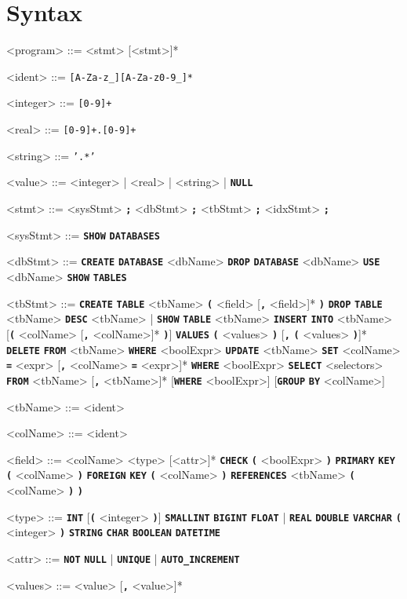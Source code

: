 \documentclass{article}
\renewcommand{\t}[1]{\texttt{\textbf{#1}}}
\begin{document}
\section{Syntax}
\setlength{\grammarindent}{10em}
\begin{grammar}

<program> ::= <stmt> [<stmt>]*

<ident> ::= \texttt{[A-Za-z_][A-Za-z0-9_]*}

<integer> ::= \texttt{[0-9]+}

<real> ::= \texttt{[0-9]+.[0-9]+}

<string> ::= \texttt{'.*'}

<value> ::= <integer> | <real> | <string> | \t{NULL}

<stmt> ::= <sysStmt> \t{;}
\alt <dbStmt> \t{;}
\alt <tbStmt> \t{;}
\alt <idxStmt> \t{;}

<sysStmt> ::= \t{SHOW} \t{DATABASES}

<dbStmt> ::= \t{CREATE} \t{DATABASE} <dbName>
\alt \t{DROP} \t{DATABASE} <dbName>
\alt \t{USE} <dbName>
\alt \t{SHOW} \t{TABLES}

<tbStmt> ::= \t{CREATE} \t{TABLE} <tbName> \t{(} <field> [\t{,} <field>]* \t{)}
\alt \t{DROP} \t{TABLE} <tbName>
\alt \t{DESC} <tbName> | \t{SHOW} \t{TABLE} <tbName>
\alt \t{INSERT} \t{INTO} <tbName> [\t{(} <colName> [\t{,} <colName>]* \t{)}] \t{VALUES} \t{(} <values> \t{)} [\t{,} \t{(} <values> \t{)}]*
\alt \t{DELETE} \t{FROM} <tbName> \t{WHERE} <boolExpr>
\alt \t{UPDATE} <tbName> \t{SET} <colName> \t{=} <expr> [\t{,} <colName> \t{=} <expr>]* \t{WHERE} <boolExpr>
\alt \t{SELECT} <selectors> \t{FROM} <tbName> [\t{,} <tbName>]* [\t{WHERE} <boolExpr>] [\t{GROUP} \t{BY} <colName>]

<tbName> ::= <ident>

<colName> ::= <ident>

<field> ::= <colName> <type> [<attr>]*
\alt \t{CHECK} \t{(} <boolExpr> \t{)}
\alt \t{PRIMARY} \t{KEY} \t{(} <colName> \t{)}
\alt \t{FOREIGN} \t{KEY} \t{(} <colName> \t{)} \t{REFERENCES} <tbName> \t{(} <colName> \t{)} \t{)}

<type> ::= \t{INT} [\t{(} <integer> \t{)}]
\alt \t{SMALLINT}
\alt \t{BIGINT}
\alt \t{FLOAT} | \t{REAL}
\alt \t{DOUBLE}
\alt \t{VARCHAR} \t{(} <integer> \t{)}
\alt \t{STRING}
\alt \t{CHAR}
\alt \t{BOOLEAN}
\alt \t{DATETIME}

<attr> ::= \t{NOT} \t{NULL} | \t{UNIQUE} | \t{AUTO_INCREMENT}

<values> ::= <value> [\t{,} <value>]*


\end{grammar}
\end{document}
